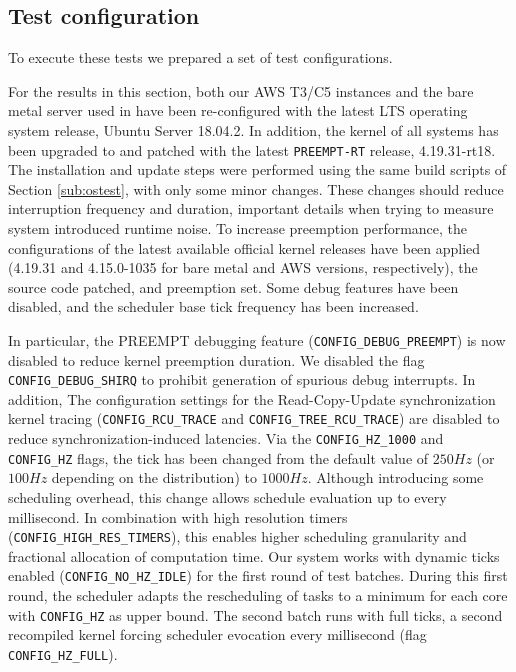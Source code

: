 \documentclass[]{scrartcl}
\begin{document}
\subsection{Test configuration}

To execute these tests we prepared a set of test configurations. 

For the results in this section, both our AWS T3/C5 instances and the bare metal server used in \cite{Hoferetal2019} have been re-configured with the latest LTS operating system release, Ubuntu Server 18.04.2.
In addition, the kernel of all systems has been upgraded to and patched with the latest \texttt{PREEMPT-RT} release, 4.19.31-rt18.
The installation and update steps were performed using the same build scripts of Section \ref{sub:ostest}, with only some minor changes.
These changes should reduce interruption frequency and duration, important details when trying to measure system introduced runtime noise.
To increase preemption performance, the configurations of the latest available official kernel releases have been applied (4.19.31 and 4.15.0-1035 for bare metal and AWS versions, respectively), the source code patched, and preemption set.
Some debug features have been disabled, and the scheduler base tick frequency has been increased.

In particular, the PREEMPT debugging feature (\texttt{CONFIG\_DEBUG\_PREEMPT}) is now disabled to reduce kernel preemption duration.
We disabled the flag \texttt{CONFIG\_DEBUG\_SHIRQ} to prohibit generation of spurious debug interrupts.
In addition, The configuration settings for the Read-Copy-Update synchronization kernel tracing  (\texttt{CONFIG\_RCU\_TRACE} and \texttt{CONFIG\_TREE\_RCU\_TRACE}) are disabled to reduce synchronization-induced latencies.
Via the \texttt{CONFIG\_HZ\_1000} and \texttt{CONFIG\_HZ} flags, the tick has been changed from the default value of $250Hz$ (or $100Hz$ depending on the distribution) to $1000Hz$.
Although introducing some scheduling overhead, this change allows schedule evaluation up to every millisecond. 
In combination with high resolution timers (\texttt{CONFIG\_HIGH\_RES\_TIMERS}), this enables higher scheduling granularity and fractional allocation of computation time.
Our system works with dynamic ticks enabled (\texttt{CONFIG\_NO\_HZ\_IDLE}) for the first round of test batches.
During this first round, the scheduler adapts the rescheduling of tasks to a minimum for each core with \texttt{CONFIG\_HZ} as upper bound. 
The second batch runs with full ticks, a second recompiled kernel forcing scheduler evocation every millisecond (flag \texttt{CONFIG\_HZ\_FULL}).
\end{document}
